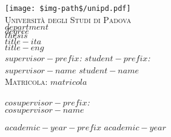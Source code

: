 \begin{center}
\texttt{[image: \$img-path\$/unipd.pdf]}\\
\vspace{0.8cm}
\textsc{\LARGE Universit\`{a} degli Studi di Padova}\\
\vspace{0.45cm}
\textsc{\large $department$}\\
\vspace{0.4cm}
\textsc{\large $degree$}\\
\vspace{1cm}
\textsc{\large $thesis$}\\
\vfill
{ \LARGE \bfseries $title-ita$
}\\
\vspace{1cm}
{ \Large $title-eng$
}\\
\vfill
\textit{\large $supervisor-prefix$:} \hfill \textit{\large $student-prefix$:}\\
\vspace{0.2cm}
\textsc{\large $supervisor-name$} \hfill \textsc{\large $student-name$}\\
\vspace{0.2cm}  
\hfill \textsc{Matricola: $matricola$}\\
\begin{flushleft}
\textit{\large $cosupervisor-prefix$:} \\
\vspace{0.2cm}
\textsc{\large $cosupervisor-name$} \hfill
\end{flushleft}

\vfill
{\large $academic-year-prefix$ $academic-year$}
\end{center}